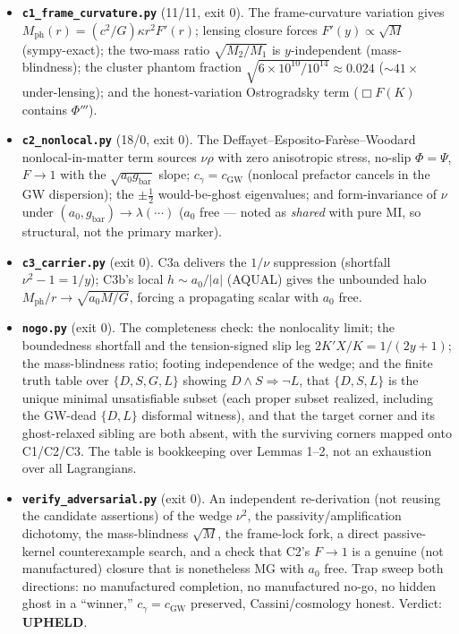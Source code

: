 \documentclass[
]{article}
\newcounter{none} %
\begin{document}
\begin{itemize}
\item
  \textbf{\texttt{c1\_frame\_curvature.py}} (11/11, exit 0). The
  frame-curvature variation gives
  \(M_\mathrm{ph}(r)=(c^2/G)\kappa r^2 F'(r)\); lensing closure forces
  \(F'(y)\propto\sqrt M\) (sympy-exact); the two-mass ratio
  \(\sqrt{M_2/M_1}\) is \(y\)-independent (mass-blindness); the cluster
  phantom fraction \(\sqrt{6\times10^{10}/10^{14}}\approx0.024\)
  (\(\sim41\times\) under-lensing); and the honest-variation
  Ostrogradsky term (\(\Box F(K)\) contains \(\Phi'''\)).
\item
  \textbf{\texttt{c2\_nonlocal.py}} (18/0, exit 0). The
  Deffayet--Esposito-Farèse--Woodard nonlocal-in-matter term sources
  \(\nu\rho\) with zero anisotropic stress, no-slip \(\Phi=\Psi\),
  \(F\to1\) with the \(\sqrt{a_0 g_\mathrm{bar}}\) slope;
  \(c_\gamma=c_\mathrm{GW}\) (nonlocal prefactor cancels in the GW
  dispersion); the \(\pm\tfrac12\) would-be-ghost eigenvalues; and
  form-invariance of \(\nu\) under
  \((a_0,g_\mathrm{bar})\to\lambda(\cdots)\) (\(a_0\) free --- noted as
  \emph{shared} with pure MI, so structural, not the primary marker).
\item
  \textbf{\texttt{c3\_carrier.py}} (exit 0). C3a delivers the \(1/\nu\)
  suppression (shortfall \(\nu^2-1=1/y\)); C3b's local \(h\sim a_0/|a|\)
  (AQUAL) gives the unbounded halo \(M_\mathrm{ph}/r\to\sqrt{a_0M/G}\),
  forcing a propagating scalar with \(a_0\) free.
\item
  \textbf{\texttt{nogo.py}} (exit 0). The completeness check: the
  nonlocality limit; the boundedness shortfall and the tension-signed
  slip leg \(2K'X/K=1/(2y+1)\); the mass-blindness ratio; footing
  independence of the wedge; and the finite truth table over
  \(\{D,S,G,L\}\) showing \(D\wedge S\Rightarrow\lnot L\), that
  \(\{D,S,L\}\) is the unique minimal unsatisfiable subset (each proper
  subset realized, including the GW-dead \(\{D,L\}\) disformal witness),
  and that the target corner and its ghost-relaxed sibling are both
  absent, with the surviving corners mapped onto C1/C2/C3. The table is
  bookkeeping over Lemmas 1--2, not an exhaustion over all Lagrangians.
\item
  \textbf{\texttt{verify\_adversarial.py}} (exit 0). An independent
  re-derivation (not reusing the candidate assertions) of the wedge
  \(\nu^2\), the passivity/amplification dichotomy, the mass-blindness
  \(\sqrt M\), the frame-lock fork, a direct passive-kernel
  counterexample search, and a check that C2's \(F\to1\) is a genuine
  (not manufactured) closure that is nonetheless MG with \(a_0\) free.
  Trap sweep both directions: no manufactured completion, no
  manufactured no-go, no hidden ghost in a ``winner,''
  \(c_\gamma=c_\mathrm{GW}\) preserved, Cassini/cosmology honest. Verdict:
  \textbf{UPHELD}.
\end{itemize}
\end{document}
